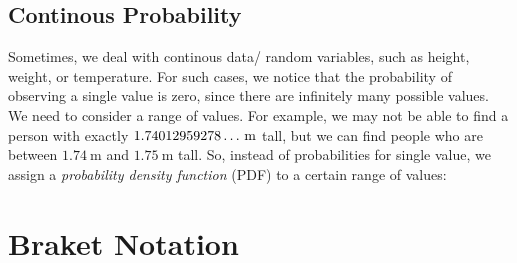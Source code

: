 \subsection{Continous Probability}
Sometimes, we deal with continous data/ random variables, such as height, weight, or temperature.
For such cases, we notice that the probability of observing a single value is zero, since there are infinitely many possible values.
We need to consider a range of values.
For example, we may not be able to find a person with exactly $\SI[parse-numbers=false]{1.74012959278\ldots}{\metre}$ tall, but we can find people who are between $\SI{1.74}{\metre}$ and $\SI{1.75}{\metre}$ tall.
So, instead of probabilities for single value, we assign a \emph{probability density function} (PDF) to a certain range of values:

\section{Braket Notation}
\label{sec:braket-notation}
